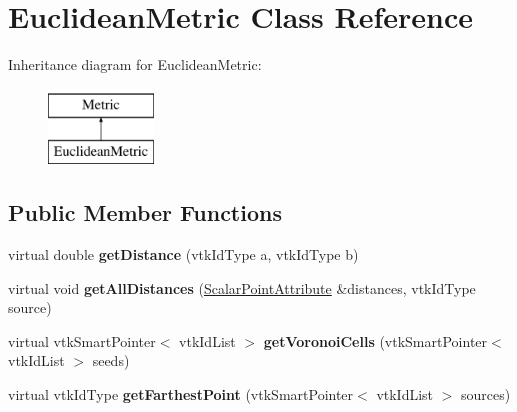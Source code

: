 \hypertarget{class_euclidean_metric}{}\section{Euclidean\+Metric Class Reference}
\label{class_euclidean_metric}
Inheritance diagram for Euclidean\+Metric\+:\begin{figure}[H]
\begin{center}
\leavevmode
\includegraphics[height=2.000000cm]{class_euclidean_metric}
\end{center}
\end{figure}
\subsection*{Public Member Functions}
\begin{DoxyCompactItemize}
\item 
\hypertarget{class_euclidean_metric_a315e2486b0aaea14c64872d345dc235c}{}virtual double {\bfseries get\+Distance} (vtk\+Id\+Type a, vtk\+Id\+Type b)\label{class_euclidean_metric_a315e2486b0aaea14c64872d345dc235c}

\item 
\hypertarget{class_euclidean_metric_a16d8796d187eb9befe46fb5ed45a710f}{}virtual void {\bfseries get\+All\+Distances} (\hyperlink{class_scalar_point_attribute}{Scalar\+Point\+Attribute} \&distances, vtk\+Id\+Type source)\label{class_euclidean_metric_a16d8796d187eb9befe46fb5ed45a710f}

\item 
\hypertarget{class_euclidean_metric_a03f0ee77bcb02777044a4a86da79e9f5}{}virtual vtk\+Smart\+Pointer$<$ vtk\+Id\+List $>$ {\bfseries get\+Voronoi\+Cells} (vtk\+Smart\+Pointer$<$ vtk\+Id\+List $>$ seeds)\label{class_euclidean_metric_a03f0ee77bcb02777044a4a86da79e9f5}

\item 
\hypertarget{class_euclidean_metric_abbbcff587376543750466b297968c48c}{}virtual vtk\+Id\+Type {\bfseries get\+Farthest\+Point} (vtk\+Smart\+Pointer$<$ vtk\+Id\+List $>$ sources)\label{class_euclidean_metric_abbbcff587376543750466b297968c48c}

\end{DoxyCompactItemize}
